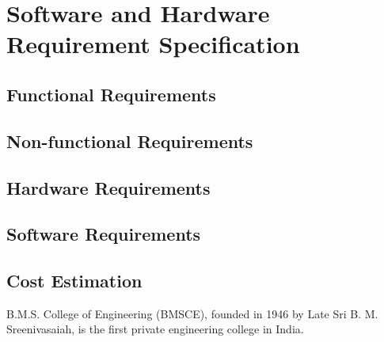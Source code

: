 \chapter{Software and Hardware Requirement Specification}
\section{Functional Requirements}
\section{Non-functional Requirements}
\section{Hardware Requirements}
\section{Software Requirements}
\section{Cost Estimation}

B.M.S. College of Engineering (BMSCE), founded in 1946 by Late Sri B. M. Sreenivasaiah, 
is the first private engineering college in India.
